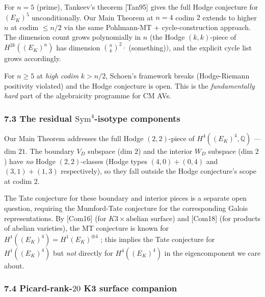 \documentclass[
  11pt,
  a4paper,
]{amsart}
\begin{document}
For \(n = 5\) (prime), Tankeev's theorem {[}Tan95{]} gives the full Hodge conjecture for \((E_K)^5\) unconditionally. Our Main Theorem at \(n = 4\) codim \(2\) extends to higher \(n\) at codim \(\leq n/2\) via the same Pohlmann-MT + cycle-construction approach. The dimension count grows polynomially in \(n\) (the Hodge \((k, k)\)-piece of \(H^{2k}((E_K)^n)\) has dimension \(\binom{n}{k}^2 \cdot\) (something)\()\), and the explicit cycle list grows accordingly.

For \(n \geq 5\) at \emph{high codim} \(k > n/2\), Schoen's framework breaks (Hodge-Riemann positivity violated) and the Hodge conjecture is open. This is the \emph{fundamentally hard} part of the algebraicity programme for CM AVs.

\hypertarget{the-residual-mathrmsym4-isotype-components}{%
\subsubsection{\texorpdfstring{7.3 The residual \(\mathrm{Sym}^4\)-isotype components}{7.3 The residual \textbackslash mathrm\{Sym\}\^{}4-isotype components}}\label{the-residual-mathrmsym4-isotype-components}}

Our Main Theorem addresses the full Hodge \((2, 2)\)-piece of \(H^4((E_K)^4, \mathbb{Q})\) --- dim \(21\). The boundary \(V_D\) subspace (dim \(2\)) and the interior \(W_D\) subspace (dim \(2\)) have \emph{no} Hodge \((2, 2)\)-classes (Hodge types \((4, 0) + (0, 4)\) and \((3, 1) + (1, 3)\) respectively), so they fall outside the Hodge conjecture's scope at codim \(2\).

The Tate conjecture for these boundary and interior pieces is a separate open question, requiring the Mumford-Tate conjecture for the corresponding Galois representations. By {[}Com16{]} (for \(K3 \times \text{abelian surface}\)) and {[}Com18{]} (for products of abelian varieties), the MT conjecture is known for \(H^1((E_K)^4) = H^1(E_K)^{\oplus 4}\) ; this implies the Tate conjecture for \(H^1((E_K)^4)\) but \emph{not} directly for \(H^4((E_K)^4)\) in the eigencomponent we care about.

\hypertarget{picard-rank-20-k3-surface-companion}{%
\subsubsection{\texorpdfstring{7.4 Picard-rank-\(20\) K3 surface companion}{7.4 Picard-rank-20 K3 surface companion}}\label{picard-rank-20-k3-surface-companion}}
\end{document}
